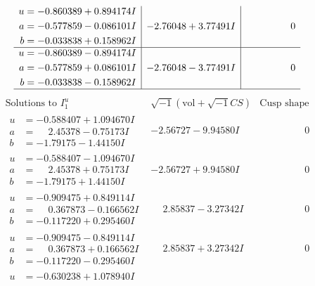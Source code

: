 \documentclass[1p]{elsarticle_modified}
\theoremstyle{definition}
\newcommand{\I}{\sqrt{-1}}
\begin{document}
$$\begin{array}{c|c|c}
\begin{aligned}
u &= -0.860389 + 0.894174 I \\
a &= -0.577859 - 0.086101 I \\
b &= -0.033838 + 0.158962 I\end{aligned}
 & -2.76048 + 3.77491 I & \phantom{-0.000000 } 0 \\ \hline\begin{aligned}
u &= -0.860389 - 0.894174 I \\
a &= -0.577859 + 0.086101 I \\
b &= -0.033838 - 0.158962 I\end{aligned}
 & -2.76048 - 3.77491 I & \phantom{-0.000000 } 0\\
 \hline 
 \end{array}$$\newpage$$\begin{array}{c|c|c}  
\text{Solutions to }I^u_{1}& \I (\text{vol} + \sqrt{-1}CS) & \text{Cusp shape}\\
 \hline 
\begin{aligned}
u &= -0.588407 + 1.094670 I \\
a &= \phantom{-}2.45378 - 0.75173 I \\
b &= -1.79175 - 1.44150 I\end{aligned}
 & -2.56727 - 9.94580 I & \phantom{-0.000000 } 0 \\ \hline\begin{aligned}
u &= -0.588407 - 1.094670 I \\
a &= \phantom{-}2.45378 + 0.75173 I \\
b &= -1.79175 + 1.44150 I\end{aligned}
 & -2.56727 + 9.94580 I & \phantom{-0.000000 } 0 \\ \hline\begin{aligned}
u &= -0.909475 + 0.849114 I \\
a &= \phantom{-}0.367873 - 0.166562 I \\
b &= -0.117220 + 0.295460 I\end{aligned}
 & \phantom{-}2.85837 - 3.27342 I & \phantom{-0.000000 } 0 \\ \hline\begin{aligned}
u &= -0.909475 - 0.849114 I \\
a &= \phantom{-}0.367873 + 0.166562 I \\
b &= -0.117220 - 0.295460 I\end{aligned}
 & \phantom{-}2.85837 + 3.27342 I & \phantom{-0.000000 } 0 \\ \hline\begin{aligned}
u &= -0.630238 + 1.078940 I \\

\end{aligned}
\end{array}$$
\end{document}
